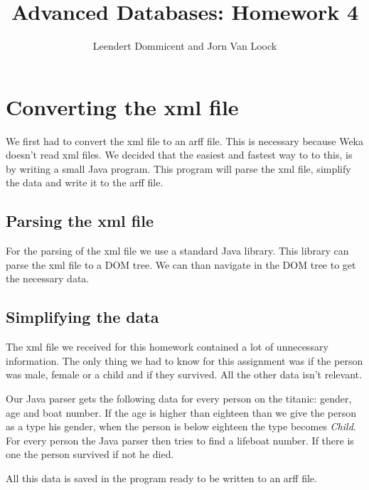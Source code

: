 \documentclass[a4]{article}
\title{Advanced Databases: Homework 4}
\author{Leendert Dommicent and Jorn Van Loock}
\begin{document}
\maketitle
\setlength{\parskip}{5pt}
\setlength{\parindent}{0pt}
\section{Converting the xml file}
We first had to convert the xml file to an arff file. This is necessary because Weka doesn't read xml files. We decided that the easiest and fastest way to to this, is by writing a small Java program. This program will parse the xml file, simplify the data and write it to the arff file.
\subsection{Parsing the xml file}
For the parsing of the xml file we use a standard Java library. This library can parse the xml file to a DOM tree. We can than navigate in the DOM tree to get the necessary data.
\subsection{Simplifying the data}
The xml file we received for this homework contained a lot of unnecessary information. The only thing we had to know for this assignment was if the person was male, female or a child and if they survived. All the other data isn't relevant.\par
Our Java parser gets the following data for every person on the titanic: gender, age and boat number. If the age is higher than eighteen than we give the person as a type his gender, when the person is below eighteen the type becomes \textit{Child}. For every person the Java parser then tries to find a lifeboat number. If there is one the person survived if not he died.\par
All this data is saved in the program ready to be written to an arff file.
\end{document}
